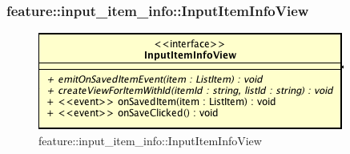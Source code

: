 \subsubsection{feature::input\_item\_info::InputItemInfoView}

\label{feature::input_item_info::InputItemInfoView}
\begin{figure}[ht]
	\centering
	\includegraphics[scale=0.5]{Sezioni/SottosezioniST/img/app/InputItemInfoView.png}
	\caption{feature::input\_item\_info::InputItemInfoView}
\end{figure}

